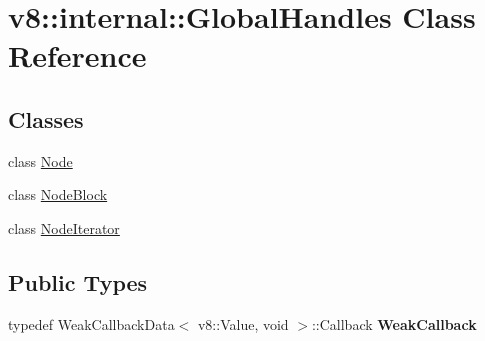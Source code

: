 \hypertarget{classv8_1_1internal_1_1_global_handles}{}\section{v8\+:\+:internal\+:\+:Global\+Handles Class Reference}
\label{classv8_1_1internal_1_1_global_handles}
\subsection*{Classes}
\begin{DoxyCompactItemize}
\item 
class \hyperlink{classv8_1_1internal_1_1_global_handles_1_1_node}{Node}
\item 
class \hyperlink{classv8_1_1internal_1_1_global_handles_1_1_node_block}{Node\+Block}
\item 
class \hyperlink{classv8_1_1internal_1_1_global_handles_1_1_node_iterator}{Node\+Iterator}
\end{DoxyCompactItemize}
\subsection*{Public Types}
\begin{DoxyCompactItemize}
\item 
\hypertarget{classv8_1_1internal_1_1_global_handles_a0c98914e97d88cdc693a1ab28d472728}{}typedef Weak\+Callback\+Data$<$ v8\+::\+Value, void $>$\+::Callback {\bfseries Weak\+Callback}\label{classv8_1_1internal_1_1_global_handles_a0c98914e97d88cdc693a1ab28d472728}

\end{DoxyCompactItemize}
